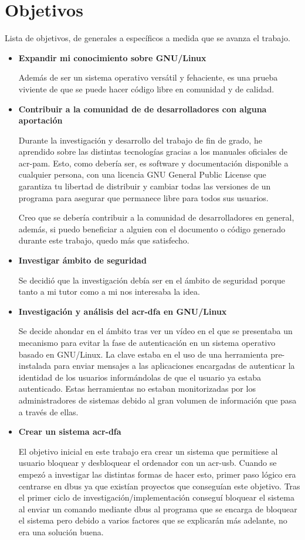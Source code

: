 \documentclass[titlepage, 12pt, a4paper]{article}
\begin{document}
\section{Objetivos}
Lista de objetivos, de generales a específicos a medida que se avanza el trabajo.
\begin{itemize}
	\item{\textbf{Expandir mi conocimiento sobre \gls{GNU/Linux}}}\par
		Además de ser un sistema operativo versátil y fehaciente, es una prueba viviente de que se puede hacer código libre en comunidad y de calidad.
	\item{\textbf{Contribuir a la comunidad de de desarrolladores con alguna aportación}}\par
		Durante la investigación y desarrollo del trabajo de fin de grado, he aprendido sobre las distintas tecnologías gracias a los manuales oficiales de \gls{acr-pam}. Esto, como debería ser, es software y documentación disponible a cualquier persona, con una licencia GNU General Public License que garantiza tu libertad de distribuir y cambiar todas las versiones de un programa para asegurar que permanece libre para todos sus usuarios. \cite{GNU-GPL} \par
		Creo que se debería contribuir a la comunidad de desarrolladores en general, además, si puedo beneficiar a alguien con el documento o código generado durante este trabajo, quedo más que satisfecho.
	\item{\textbf{Investigar ámbito de seguridad}}\par
		Se decidió que la investigación debía ser en el ámbito de seguridad porque tanto a mi tutor como a mi nos interesaba la idea.
	\item{\textbf{Investigación y análisis del \gls{acr-dfa} en \gls{GNU/Linux}}}\par
		Se decide ahondar en el ámbito tras ver un vídeo en el que se presentaba un mecanismo para evitar la fase de autenticación en un sistema operativo basado en \gls{GNU/Linux}. La clave estaba en el uso de una herramienta pre-instalada para enviar mensajes a las aplicaciones encargadas de autenticar la identidad de los usuarios informándolas de que el usuario ya estaba autenticado. Estas herramientas no estaban monitorizadas por los administradores de sistemas debido al gran volumen de información que pasa a través de ellas.
	\item{\textbf{Crear un sistema \gls{acr-dfa}}}\par
		El objetivo inicial en este trabajo era crear un sistema que permitiese al usuario bloquear y desbloquear el ordenador con un \gls{acr-usb}. Cuando se empezó a investigar las distintas formas de hacer esto, primer paso lógico era centrarse en \gls{dbus} ya que existían proyectos que conseguían este objetivo. Tras el primer ciclo de investigación/implementación conseguí bloquear el sistema al enviar un comando mediante \gls{dbus} al programa que se encarga de bloquear el sistema pero debido a varios factores que se explicarán más adelante, no era una solución buena. \par 

\end{itemize}
\end{document}
